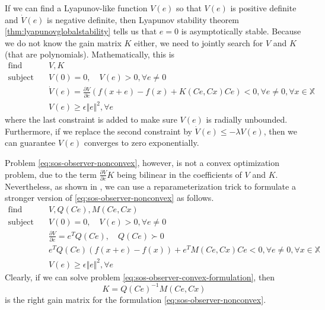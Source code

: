 \documentclass[
]{book}
\theoremstyle{definition}
\theoremstyle{definition}
\theoremstyle{definition}
\theoremstyle{definition}
\theoremstyle{remark}
\begin{document}
If we can find a Lyapunov-like function \(V(e)\) so that \(V(e)\) is positive definite and \(\dot{V}(e)\) is negative definite, then Lyapunov stability theorem \ref{thm:lyapunovglobalstability} tells us that \(e=0\) is asymptotically stable. Because we do not know the gain matrix \(K\) either, we need to jointly search for \(V\) and \(K\) (that are polynomials). Mathematically, this is
\begin{equation}
\begin{split}
\text{find} & \quad V, K \\
\text{subject to} & \quad V(0) = 0, \quad V(e) > 0, \forall e \neq 0 \\
& \quad \dot{V}(e) = \frac{\partial V}{\partial e} \left( f(x + e) - f(x) + K(Ce,Cx)C e \right) < 0, \forall e \neq 0, \forall x \in \mathbb{X} \\
& \quad V(e) \geq \epsilon \Vert e \Vert^2, \forall e
\end{split}
\label{eq:sos-observer-nonconvex}
\end{equation}
where the last constraint is added to make sure \(V(e)\) is radially unbounded. Furthermore, if we replace the second constraint by \(\dot{V}(e) \leq - \lambda V(e)\), then we can guarantee \(V(e)\) converges to zero exponentially.

Problem \eqref{eq:sos-observer-nonconvex}, however, is not a convex optimization problem, due to the term \(\frac{\partial V}{\partial e} K\) being bilinear in the coefficients of \(V\) and \(K\). Nevertheless, as shown in \citep{ebenbauer05cdc-polynomial}, we can use a reparameterization trick to formulate a stronger version of \eqref{eq:sos-observer-nonconvex} as follows.
\begin{equation}
\begin{split}
\text{find} & \quad V, Q(Ce), M(Ce,Cx) \\
\text{subject to} & \quad V(0) = 0, \quad V(e) > 0, \forall e \neq 0 \\
& \quad \frac{\partial V}{\partial e} = e^T Q(Ce), \quad Q(Ce) \succ 0 \\
& \quad e^T Q(Ce) \left( f(x + e) - f(x) \right) + e^T M(Ce,Cx) C e < 0, \forall e \neq 0, \forall x \in \mathbb{X} \\
& \quad V(e) \geq \epsilon \Vert e \Vert^2, \forall e
\end{split}
\label{eq:sos-observer-convex-formulation}
\end{equation}
Clearly, if we can solve problem \eqref{eq:sos-observer-convex-formulation}, then
\[
K = Q(Ce)^{-1} M(Ce,Cx)
\]
is the right gain matrix for the formulation \eqref{eq:sos-observer-nonconvex}.
\end{document}

